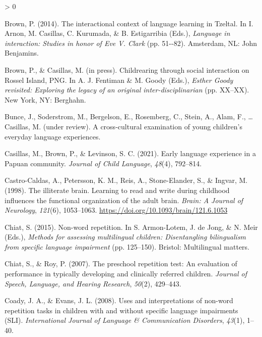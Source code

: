 \documentclass[
  american,
  ,man,floatsintext]{apa6}
\newlength{\cslhangindent}
\newenvironment{CSLReferences}[2] %
 {%
  \setlength{\parindent}{0pt}
  \ifodd #1 \everypar{\setlength{\hangindent}{\cslhangindent}}\ignorespaces\fi
  \ifnum #2 > 0
  \setlength{\parskip}{#2\baselineskip}
  \fi
 }%
 {}
\begin{document}
\begin{CSLReferences}{1}{0}
\leavevmode\hypertarget{ref-brown2014interactional}{}%
Brown, P. (2014). The interactional context of language learning in {T}zeltal. In I. Arnon, M. Casillas, C. Kurumada, \& B. Estigarribia (Eds.), \emph{Language in interaction: Studies in honor of {Eve V. Clark}} (pp. 51-\/-82). Amsterdam, NL: John Benjamins.

\leavevmode\hypertarget{ref-brownIPchildrearing}{}%
Brown, P., \& Casillas, M. (in press). Childrearing through social interaction on {Rossel Island, PNG}. In A. J. Fentiman \& M. Goody (Eds.), \emph{{Esther Goody} revisited: Exploring the legacy of an original inter-disciplinarian} (pp. XX--XX). New York, NY: Berghahn.

\leavevmode\hypertarget{ref-bunceURcrosscultural}{}%
Bunce, J., Soderstrom, M., Bergelson, E., Rosemberg, C., Stein, A., Alam, F., \ldots{} Casillas, M. (under review). A cross-cultural examination of young children's everyday language experiences.

\leavevmode\hypertarget{ref-casillas2021early}{}%
Casillas, M., Brown, P., \& Levinson, S. C. (2021). {Early language experience in a Papuan community}. \emph{Journal of Child Language}, \emph{48}(4), 792--814.

\leavevmode\hypertarget{ref-castro1998illiterate}{}%
Castro-Caldas, A., Petersson, K. M., Reis, A., Stone-Elander, S., \& Ingvar, M. (1998). {The illiterate brain. Learning to read and write during childhood influences the functional organization of the adult brain.} \emph{Brain: A Journal of Neurology}, \emph{121}(6), 1053--1063. \url{https://doi.org/10.1093/brain/121.6.1053}

\leavevmode\hypertarget{ref-chiat2015nonword}{}%
Chiat, S. (2015). Non-word repetition. In S. Armon-Lotem, J. de Jong, \& N. Meir (Eds.), \emph{Methods for assessing multilingual children: Disentangling bilingualism from specific language impairment} (pp. 125--150). Bristol: Multilingual matters.

\leavevmode\hypertarget{ref-chiat2007preschool}{}%
Chiat, S., \& Roy, P. (2007). The preschool repetition test: An evaluation of performance in typically developing and clinically referred children. \emph{Journal of Speech, Language, and Hearing Research}, \emph{50}(2), 429--443.

\leavevmode\hypertarget{ref-coady2008uses}{}%
Coady, J. A., \& Evans, J. L. (2008). Uses and interpretations of non-word repetition tasks in children with and without specific language impairments (SLI). \emph{International Journal of Language \& Communication Disorders}, \emph{43}(1), 1--40.


\end{CSLReferences}
\end{document}
